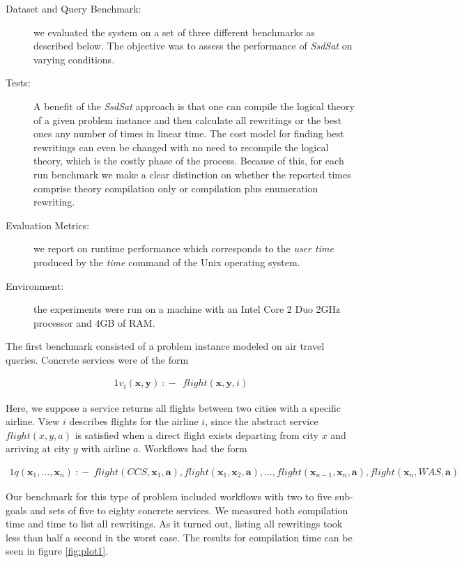 \documentclass{llncs}
\newcommand{\vvec}[1]{\mathbf{#1}}
\newcommand{\qrule}{:\!\!-}
\newcommand{\ssdsat}{{\it SsdSat} }
\begin{document}
\begin{description}
\item[Dataset and Query Benchmark:] we evaluated the system on a set of three
different benchmarks as described below. The objective was to assess the
performance of \ssdsat on varying conditions.
\item[Tests:] A benefit of the \ssdsat approach is that one can compile the
logical theory of a given problem instance and then calculate all rewritings or
the best ones any number of times in linear time. The cost model for finding
best rewritings can even be changed with no need to recompile the logical
theory, which is the costly phase of the process. Because of this, for each run
benchmark we make a clear distinction on whether the reported times comprise
theory compilation only or compilation plus enumeration rewriting.
\item[Evaluation Metrics:] we report on runtime performance which corresponds to the {\it user time} produced by the {\it time} command of the Unix operating system. 
\item[Environment:] the experiments were run on a machine with an Intel Core 2 Duo 2GHz processor and 4GB of RAM.
\end{description}

The first benchmark consisted of a problem instance modeled on air
travel queries. Concrete services were of the form

\begin{alignat*}{1}
v_i(\vvec{x}, \vvec{y})\ \qrule\ \  flight(\vvec{x},\vvec{y},i)
\end{alignat*}

Here, we suppose a service returns all flights between two cities with a specific
airline. View $i$ describes flights for the airline $i$, since the abstract service
$flight(x,y,a)$ is satisfied when a direct flight exists departing from city $x$
and arriving at city $y$ with airline $a$. Workflows had the form

\begin{alignat*}{1}
q(\vvec{x}_1, \ldots, \vvec{x}_n)\ \qrule\ flight(CCS, \vvec{x}_1, \vvec{a}),
flight(\vvec{x}_1, \vvec{x}_2, \vvec{a}),
\ldots,
flight(\vvec{x}_{n-1}, \vvec{x}_n, \vvec{a}),
flight(\vvec{x}_n, WAS, \vvec{a})
\end{alignat*}

Our benchmark for this type of problem included workflows with two to five
sub-goals and sets of five to eighty concrete services. We measured both compilation time
and time to list all rewritings. As it turned out, listing all rewritings took
less than half a second in the worst case. The results for compilation time can
be seen in figure \ref{fig:plot1}.
\end{document}
